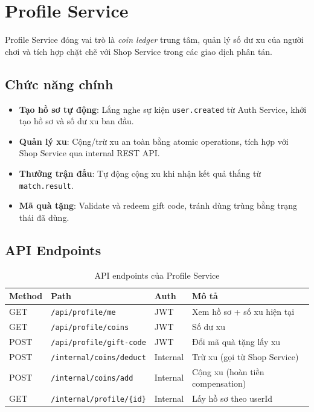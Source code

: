 \documentclass[12pt,a4paper]{report}
\newcommand{\topic}[1]{\texttt{\textcolor{micropurple}{#1}}}
\begin{document}
\section{Profile Service}

Profile Service đóng vai trò là \textit{coin ledger} trung tâm, quản lý số dư xu của người chơi và tích hợp chặt chẽ với Shop Service trong các giao dịch phân tán.

\subsection{Chức năng chính}

\begin{itemize}
  \item \textbf{Tạo hồ sơ tự động}: Lắng nghe sự kiện \topic{user.created} từ Auth Service, khởi tạo hồ sơ và số dư xu ban đầu.
  \item \textbf{Quản lý xu}: Cộng/trừ xu an toàn bằng atomic operations, tích hợp với Shop Service qua internal REST API.
  \item \textbf{Thưởng trận đấu}: Tự động cộng xu khi nhận kết quả thắng từ \topic{match.result}.
  \item \textbf{Mã quà tặng}: Validate và redeem gift code, tránh dùng trùng bằng trạng thái đã dùng.
\end{itemize}

\subsection{API Endpoints}

\begin{table}[H]
\centering
\caption{API endpoints của Profile Service}
\label{tab:profileapi}
\begin{tabularx}{\textwidth}{lllX}
\toprule
\textbf{Method} & \textbf{Path} & \textbf{Auth} & \textbf{Mô tả} \\
\midrule
GET  & \texttt{/api/profile/me}            & JWT      & Xem hồ sơ + số xu hiện tại \\
GET  & \texttt{/api/profile/coins}         & JWT      & Số dư xu \\
POST & \texttt{/api/profile/gift-code}     & JWT      & Đổi mã quà tặng lấy xu \\
POST & \texttt{/internal/coins/deduct}     & Internal & Trừ xu (gọi từ Shop Service) \\
POST & \texttt{/internal/coins/add}        & Internal & Cộng xu (hoàn tiền compensation) \\
GET  & \texttt{/internal/profile/\{id\}}   & Internal & Lấy hồ sơ theo userId \\
\bottomrule
\end{tabularx}
\end{table}
\end{document}
